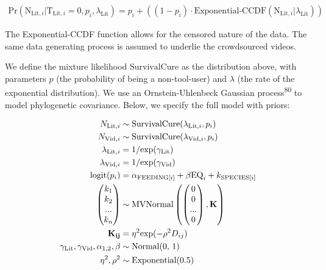 \documentclass[
  man,floatsintext]{apa6}
\begin{document}
\begin{align}
\text{Pr}(\text{N}_{\text{Lit},i}|\text{T}_{\text{Lit},i} = 0,p_i,\lambda_\text{Lit}) = p_i + ((1-p_i)\cdot\text{Exponential-CCDF}(\text{N}_{\text{Lit},i}|\lambda_\text{Lit}))
\end{align}

The Exponential-CCDF function allows for the censored nature of the data. The
same data generating process is assumed to underlie the crowdsourced videos.

We define the mixture likelihood \(\text{SurvivalCure}\) as the distribution
above, with parameters \(p\) (the probability of being a non-tool-user)
and \(\lambda\) (the rate of the exponential distribution). We use an
Ornstein-Uhlenbeck Gaussian process\textsuperscript{80} to model phylogenetic
covariance. Below, we specify the full model with priors:

\begin{align}
N_{\text{Lit},i} &\sim \text{SurvivalCure}(\lambda_{\text{Lit},i}, p_{i}) \\
N_{\text{Vid},i} &\sim \text{SurvivalCure}(\lambda_{\text{Vid},i}, p_{i}) \nonumber \\
\lambda_{\text{Lit},i} &= 1 / \text{exp}(\gamma_\text{Lit}) \nonumber \\
\lambda_{\text{Vid},i} &= 1 / \text{exp}(\gamma_\text{Vid}) \nonumber \\
\text{logit}(p_{i}) &= \alpha_{\text{FEEDING}[i]} + \beta\text{EQ}_{i} +  k_{\text{SPECIES}[i]} \nonumber \\
\begin{pmatrix}k_{1}\\k_{2}\\...\\k_{n}\\\end{pmatrix}
&\sim \text{MVNormal}
\begin{pmatrix}\begin{pmatrix}0\\0\\...\\0\\\end{pmatrix},\bf{K}\end{pmatrix} \nonumber \\
\bf{K}_{ij} &= \eta^2\text{exp}(-\rho^2D_{ij}) \nonumber \\
\gamma_\text{Lit}, \gamma_\text{Vid}, \alpha_{1,2}, \beta &\sim \text{Normal(0, 1)} \nonumber \\
\eta^2, \rho^2 &\sim \text{Exponential(0.5)} \nonumber
\end{align}
\end{document}
